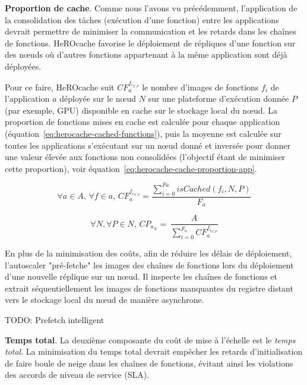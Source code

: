 \textbf{Proportion de cache}. Comme nous l'avons vu précédemment, l'application de la consolidation des tâches (exécution d'une fonction) entre les applications devrait permettre de minimiser la communication et les retards dans les chaînes de fonctions. HeROcache favorise le déploiement de répliques d'une fonction sur des nœuds où d'autres fonctions appartenant à la même application sont déjà déployées.

Pour ce faire, HeROcache suit $CF_{a}^{{f}_{i_{N, P}}}$ le nombre d'images de fonctions ${f}_{i}$ de l'application $a$ déployée sur le nœud $N$ sur une plateforme d'exécution donnée $P$ (par exemple, GPU) disponible en cache sur le stockage local du nœud. La proportion de fonctions mises en cache est calculée pour chaque application (équation~\ref{eq:herocache-cached-functions}), puis la moyenne est calculée sur toutes les applications s'exécutant sur un nœud donné et inversée pour donner une valeur élevée aux fonctions non consolidées (l'objectif étant de minimiser cette proportion), voir équation~\ref{eq:herocache-cache-proportion-app}.

\begin{equation}
    \forall a \in A, \, \forall f \in a, \, CF_{a}^{{f}_{i_{N, P}}} = \frac{\sum_{i = 0}^{Fa} isCached(f_{i}, N, P)}{F_{a}}
\label{eq:herocache-cached-functions}
\end{equation}

\begin{equation}
    \forall N, \forall P \in N, \, {CP}_{{a}_{N}} = \, \frac{A}{\sum_{i = 0}^{F_{a}} CF_{a}^{{f}_{i_{N, P}}}}
\label{eq:herocache-cache-proportion-app}
\end{equation}

En plus de la minimisation des coûts, afin de réduire les délais de déploiement, l'autoscaler "pré-fetche" les images des chaînes de fonctions lors du déploiement d'une nouvelle réplique sur un nœud. Il inspecte les chaînes de fonctions et extrait séquentiellement les images de fonctions manquantes du registre distant vers le stockage local du nœud de manière asynchrone.

TODO: Prefetch intelligent \cite{leeSPESOptimizingPerformanceResource2024a}

\textbf{Temps total}. La deuxième composante du coût de mise à l'échelle est le \textit{temps total}. La minimisation du temps total devrait empêcher les retards d'initialisation de faire boule de neige dans les chaînes de fonctions, évitant ainsi les violations des accords de niveau de service (SLA).

